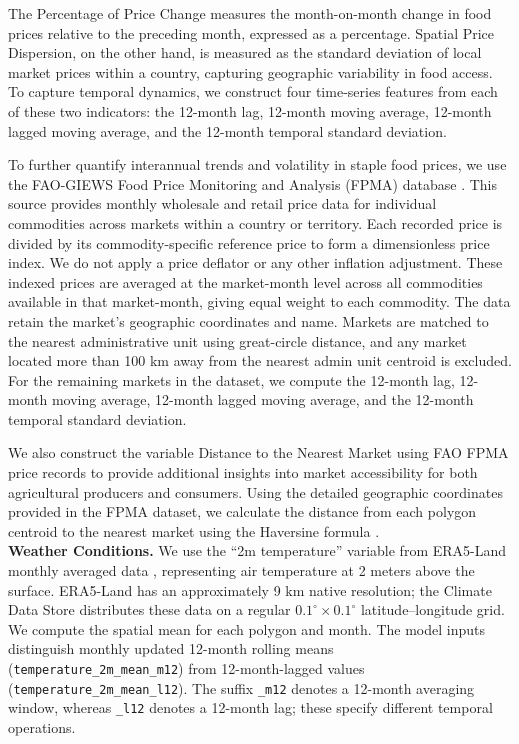 \documentclass[pdflatex,sn-mathphys-num]{sn-jnl}%
\theoremstyle{thmstyleone}%
\theoremstyle{thmstyletwo}%
\theoremstyle{thmstylethree}%
\begin{document}
The Percentage of Price Change measures the month-on-month change in food prices relative to the preceding month, expressed as a percentage. Spatial Price Dispersion, on the other hand, is measured as the standard deviation of local market prices within a country, capturing geographic variability in food access. To capture temporal dynamics, we construct four time-series features from each of these two indicators: the 12-month lag, 12-month moving average, 12-month lagged moving average, and the 12-month temporal standard deviation.

To further quantify interannual trends and volatility in staple food prices, we use the FAO-GIEWS Food Price Monitoring and Analysis (FPMA) database \cite{FAO_FPMA2024}. This source provides monthly wholesale and retail price data for individual commodities across markets within a country or territory. Each recorded price is divided by its commodity-specific reference price to form a dimensionless price index. We do not apply a price deflator or any other inflation adjustment. These indexed prices are averaged at the market-month level across all commodities available in that market-month, giving equal weight to each commodity. The data retain the market’s geographic coordinates and name. Markets are matched to the nearest administrative unit using great-circle distance, and any market located more than 100 km away from the nearest admin unit centroid is excluded. For the remaining markets in the dataset, we compute the 12-month lag, 12-month moving average, 12-month lagged moving average, and the 12-month temporal standard deviation.

 We also construct the variable Distance to the Nearest Market using FAO FPMA price records \cite{FAO_FPMA2024} to provide additional insights into market accessibility for both agricultural producers and consumers. Using the detailed geographic coordinates provided in the FPMA dataset, we calculate the distance from each polygon centroid to the nearest market using the Haversine formula \cite{sinnott1984virtues}.\\ %

\noindent\textbf{Weather Conditions.}
We use the ``2m temperature'' variable from ERA5-Land monthly averaged data \cite{ERA5Land_C3S}, representing air temperature at 2 meters above the surface. ERA5-Land has an approximately 9 km native resolution; the Climate Data Store distributes these data on a regular $0.1^\circ \times 0.1^\circ$ latitude--longitude grid. We compute the spatial mean for each polygon and month. The model inputs distinguish monthly updated 12-month rolling means (\texttt{temperature\_2m\_mean\_m12}) from 12-month-lagged values (\texttt{temperature\_2m\_mean\_l12}). The suffix \texttt{\_m12} denotes a 12-month averaging window, whereas \texttt{\_l12} denotes a 12-month lag; these specify different temporal operations.
\end{document}
